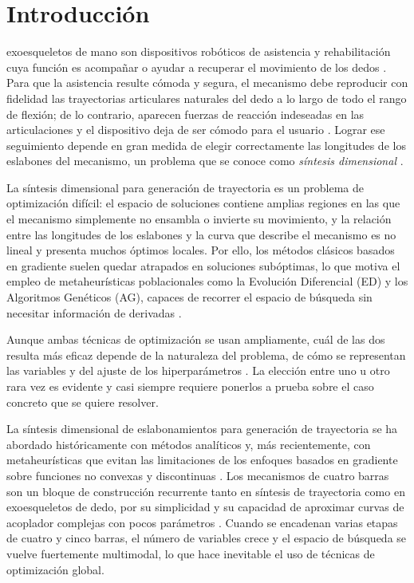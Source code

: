 \section{Introducción}
 exoesqueletos de mano son dispositivos robóticos de asistencia y
rehabilitación cuya función es acompañar o ayudar a recuperar el movimiento de
los dedos \cite{ref_exo_review}. Para que la asistencia resulte cómoda y segura,
el mecanismo debe reproducir con fidelidad las trayectorias articulares naturales
del dedo a lo largo de todo el rango de flexión; de lo contrario, aparecen
fuerzas de reacción indeseadas en las articulaciones y el dispositivo deja de ser
cómodo para el usuario \cite{ref_fourbar_nat}. Lograr ese seguimiento depende en
gran medida de elegir correctamente las longitudes de los eslabones del
mecanismo, un problema que se conoce como \emph{síntesis dimensional}
\cite{ref_de_fourbar}.

La síntesis dimensional para generación de trayectoria es un problema de
optimización difícil: el espacio de soluciones contiene amplias regiones en las
que el mecanismo simplemente no ensambla o invierte su movimiento, y la relación
entre las longitudes de los eslabones y la curva que describe el mecanismo es no
lineal y presenta muchos óptimos locales. Por ello, los métodos clásicos basados
en gradiente suelen quedar atrapados en soluciones subóptimas, lo que motiva el
empleo de metaheurísticas poblacionales como la Evolución Diferencial (ED) y los
Algoritmos Genéticos (AG), capaces de recorrer el espacio de búsqueda sin
necesitar información de derivadas \cite{ref_de_fourbar,ref_tlbo}.

Aunque ambas técnicas de optimización se usan ampliamente, cuál de las dos
resulta más eficaz depende de la naturaleza del problema, de cómo se representan
las variables y del ajuste de los hiperparámetros
\cite{ref_ga_pso_de,ref_de_vs_ga}. La elección entre uno u otro rara vez es
evidente y casi siempre requiere ponerlos a prueba sobre el caso concreto que se
quiere resolver.

La síntesis dimensional de eslabonamientos para generación de trayectoria se ha
abordado históricamente con métodos analíticos y, más recientemente, con
metaheurísticas que evitan las limitaciones de los enfoques basados en gradiente
sobre funciones no convexas y discontinuas \cite{ref_de_fourbar,ref_tlbo}. Los
mecanismos de cuatro barras son un bloque de construcción recurrente tanto en
síntesis de trayectoria como en exoesqueletos de dedo, por su simplicidad y su
capacidad de aproximar curvas de acoplador complejas con pocos parámetros
\cite{ref_fourbar_nat,ref_exo_stephenson}. Cuando se encadenan varias etapas de
cuatro y cinco barras, el número de variables crece y el espacio de búsqueda se
vuelve fuertemente multimodal, lo que hace inevitable el uso de técnicas de
optimización global.


